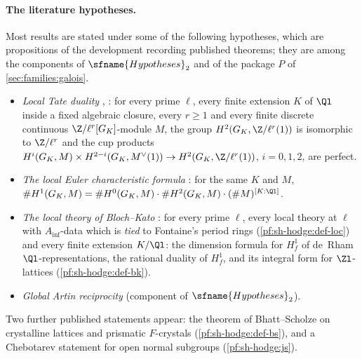 \paragraph{The literature hypotheses.}
Most results are stated under some of the following hypotheses, which are propositions of the development
recording published theorems; they are among the components of $\sfname{Hypotheses}_2$ and of the package $P$ of
\cref{sec:families:galois}.
\begin{itemize}
\item[\shhodgeLTD] \emph{Local Tate duality} \cite{Tate1963}, \cite[Ch.~II, \S5]{Serre1997}: for every prime $\ell$, every
  finite extension $K$ of $\Ql$ inside a fixed algebraic closure, every $r\ge1$ and every finite discrete continuous
  $\Z/\ell^r[G_K]$-module $M$, the group $H^2(G_K,\Z/\ell^r(1))$ is isomorphic to $\Z/\ell^r$ and the cup products
  $H^i(G_K,M)\times H^{2-i}(G_K,M^\vee(1))\to H^2(G_K,\Z/\ell^r(1))$, $i=0,1,2$, are perfect.
\item[\shhodgeLEC] \emph{The local Euler characteristic formula} \cite{Tate1963}: for the same $K$ and $M$,
  $\#H^1(G_K,M)=\#H^0(G_K,M)\cdot\#H^2(G_K,M)\cdot(\#M)^{[K:\Ql]}$.
\item[\shhodgeBK] \emph{The local theory of Bloch--Kato} \cite{BlochKato1990}: for every prime $\ell$, every local theory at
  $\ell$ with $A_{\inf}$-data which is \emph{tied} to Fontaine's period rings (\cref{pf:sh-hodge:def-loc}) and every finite
  extension $K/\Ql$: the dimension formula for $H^1_f$ of de~Rham $\Ql$-representations, the rational duality of $H^1_f$,
  and its integral form for $\Zl$-lattices (\cref{pf:sh-hodge:def-bk}).
\item[\shhodgeGAR] \emph{Global Artin reciprocity} (component of $\sfname{Hypotheses}_2$).
\end{itemize}
Two further published statements appear: the theorem of Bhatt--Scholze on crystalline lattices and prismatic
$F$-crystals \cite{BhattScholze2023} (\cref{pf:sh-hodge:def-bs}), and a Chebotarev statement for open normal subgroups
(\cref{pf:sh-hodge:js}).

